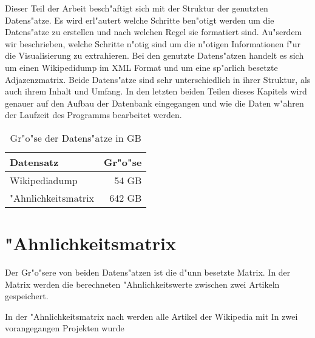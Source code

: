 

Dieser Teil der Arbeit besch"aftigt sich mit der Struktur der genutzten Datens"atze.
Es wird erl"autert welche Schritte ben"otigt werden um die Datens"atze zu erstellen und nach welchen Regel sie formatiert sind.
Au"serdem wir beschrieben, welche Schritte n"otig sind um die n"otigen Informationen f"ur die Visualisierung zu extrahieren.
Bei den genutzte Datens"atzen handelt es sich um einen Wikipedidump im XML Format und um eine sp"arlich besetzte Adjazenzmatrix.
Beide Datens"atze sind sehr unterschiedlich in ihrer Struktur, als auch ihrem Inhalt und Umfang.
In den letzten beiden Teilen dieses Kapitels wird genauer auf den Aufbau der Datenbank eingegangen und wie die Daten w"ahren der Laufzeit des Programms bearbeitet werden.

\begin{table}
\centering
\begin{tabular}{l r}
  \hline
  Datensatz & Gr"o"se \\
  \hline
  Wikipediadump & 54 GB \\
  "Ahnlichkeitsmatrix & 642 GB \\
  \hline
\end{tabular}
\caption{Gr"o"se der Datens"atze in GB}
\label{dataset-size}
\end{table}


\section{"Ahnlichkeitsmatrix}
Der Gr"o"sere von beiden Datens"atzen ist die d"unn besetzte Matrix.
In der Matrix werden die berechneten "Ahnlichkeitswerte zwischen zwei Artikeln gespeichert.

In der "Ahnlichkeitsmatrix nach \cite{riehmann2016visualizing} werden alle Artikel der Wikipedia mit 
In zwei vorangegangen Projekten wurde



